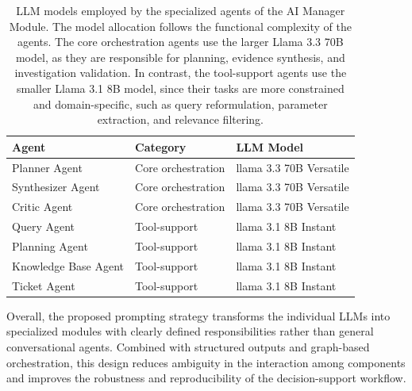 \begin{table}[htbp]
    \centering
    \caption{LLM models employed by the specialized agents of the AI Manager Module. The model allocation follows the functional complexity of the agents. The core orchestration agents use the larger Llama 3.3 70B model, as they are responsible for planning, evidence synthesis, and investigation validation. In contrast, the tool-support agents use the smaller Llama 3.1 8B model, since their tasks are more constrained and domain-specific, such as query reformulation, parameter extraction, and relevance filtering.}
    \label{tab:agent_models}
    \begin{tabular}{lll}
        \hline
        \textbf{Agent} & \textbf{Category} & \textbf{LLM Model} \\
        \hline
        Planner Agent    & Core orchestration & llama 3.3 70B Versatile \\
        Synthesizer Agent & Core orchestration & llama 3.3 70B Versatile \\
        Critic Agent     & Core orchestration & llama 3.3 70B Versatile \\
        Query Agent      & Tool-support & llama 3.1 8B Instant \\
        Planning Agent   & Tool-support & llama 3.1 8B Instant \\
        Knowledge Base Agent     & Tool-support & llama 3.1 8B Instant \\
        Ticket Agent     & Tool-support & llama 3.1 8B Instant \\
        \hline
    \end{tabular}
\end{table}

Overall, the proposed prompting strategy transforms the individual LLMs into specialized modules with clearly defined responsibilities rather than general conversational agents. Combined with structured outputs and graph-based orchestration, this design reduces ambiguity in the interaction among components and improves the robustness and reproducibility of the decision-support workflow.

